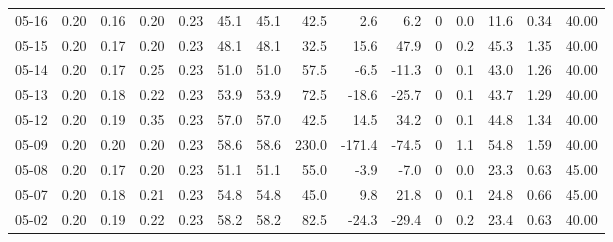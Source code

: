 \begin{threeparttable}
{\begin{tabular}{lrrrrrrrrrrrrrr}
  05-16 &          0.20 &          0.16 &          0.20 &        0.23 &                45.1 &               45.1 &                42.5 &        2.6 &          6.2 &              0 &                 0.0 &             11.6 &            0.34 &                  40.00 \\
  05-15 &          0.20 &          0.17 &          0.20 &        0.23 &                48.1 &               48.1 &                32.5 &       15.6 &         47.9 &              0 &                 0.2 &             45.3 &            1.35 &                  40.00 \\
  05-14 &          0.20 &          0.17 &          0.25 &        0.23 &                51.0 &               51.0 &                57.5 &       -6.5 &        -11.3 &              0 &                 0.1 &             43.0 &            1.26 &                  40.00 \\
  05-13 &          0.20 &          0.18 &          0.22 &        0.23 &                53.9 &               53.9 &                72.5 &      -18.6 &        -25.7 &              0 &                 0.1 &             43.7 &            1.29 &                  40.00 \\
  05-12 &          0.20 &          0.19 &          0.35 &        0.23 &                57.0 &               57.0 &                42.5 &       14.5 &         34.2 &              0 &                 0.1 &             44.8 &            1.34 &                  40.00 \\
  05-09 &          0.20 &          0.20 &          0.20 &        0.23 &                58.6 &               58.6 &               230.0 &     -171.4 &        -74.5 &              0 &                 1.1 &             54.8 &            1.59 &                  40.00 \\
  05-08 &          0.20 &          0.17 &          0.20 &        0.23 &                51.1 &               51.1 &                55.0 &       -3.9 &         -7.0 &              0 &                 0.0 &             23.3 &            0.63 &                  45.00 \\
  05-07 &          0.20 &          0.18 &          0.21 &        0.23 &                54.8 &               54.8 &                45.0 &        9.8 &         21.8 &              0 &                 0.1 &             24.8 &            0.66 &                  45.00 \\
  05-02 &          0.20 &          0.19 &          0.22 &        0.23 &                58.2 &               58.2 &                82.5 &      -24.3 &        -29.4 &              0 &                 0.2 &             23.4 &            0.63 &                  40.00 \\

\end{tabular}}
\end{threeparttable}
